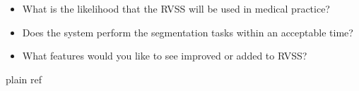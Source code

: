 \documentclass[12pt, titlepage]{article}
\begin{document}
\begin{itemize}
    \item What is the likelihood that the RVSS will be used in medical practice?
    \item Does the system perform the segmentation tasks within an acceptable time?    
    \item What features would you like to see improved or added to RVSS?   



\end{itemize}


 {plain}
 {ref}
\end{document}
